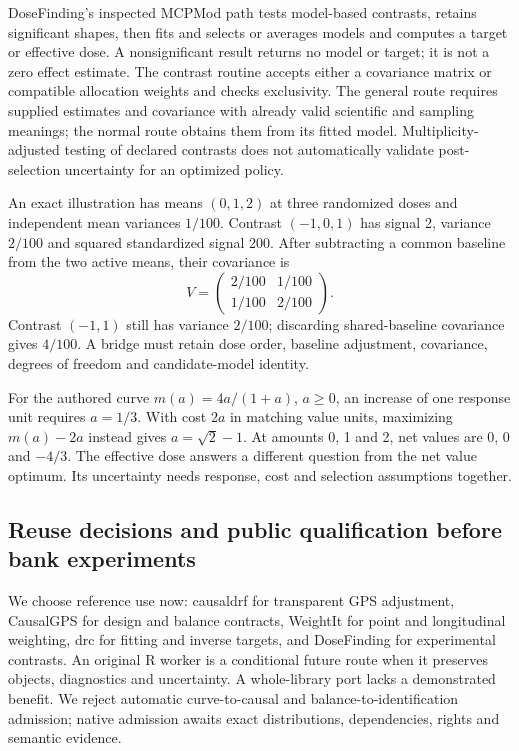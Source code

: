 DoseFinding's inspected MCPMod path tests model-based contrasts, retains
significant shapes, then fits and selects or averages models and computes a
target or effective dose. A nonsignificant result returns no model or target;
it is not a zero effect estimate. The contrast routine accepts either a
covariance matrix or compatible allocation weights and checks exclusivity.
The general route requires supplied estimates and covariance with already
valid scientific and sampling meanings; the normal route obtains them from
its fitted model. Multiplicity-adjusted testing of declared contrasts does not
automatically validate post-selection uncertainty for an optimized policy.
\citep{exec24_dose_dosefinding}

An exact illustration has means $(0,1,2)$ at three randomized doses and
independent mean variances $1/100$. Contrast $(-1,0,1)$ has signal 2, variance
$2/100$ and squared standardized signal 200. After subtracting a common
baseline from the two active means, their covariance is
\[
 V=\begin{pmatrix}2/100&1/100\\1/100&2/100\end{pmatrix}.
\]
Contrast $(-1,1)$ still has variance $2/100$; discarding shared-baseline
covariance gives $4/100$. A bridge must retain dose order, baseline adjustment,
covariance, degrees of freedom and candidate-model identity.
\citep{exec24_dose_contract}

For the authored curve $m(a)=4a/(1+a)$, $a\geq0$, an increase of one response
unit requires $a=1/3$. With cost $2a$ in matching value units, maximizing
$m(a)-2a$ instead gives $a=\sqrt2-1$. At amounts 0, 1 and 2, net values are
0, 0 and $-4/3$. The effective dose answers a different question from the net
value optimum. Its uncertainty needs response, cost and selection assumptions
together.\citep{exec24_dose_contract}

\subsection{Reuse decisions and public qualification before bank experiments}
We choose reference use now: causaldrf for transparent GPS adjustment,
CausalGPS for design and balance contracts, WeightIt for point and longitudinal
weighting, drc for fitting and inverse targets, and DoseFinding for experimental
contrasts. An original R worker is a conditional future route when it preserves
objects, diagnostics and uncertainty. A whole-library port lacks a demonstrated
benefit. We reject automatic curve-to-causal and balance-to-identification
admission; native admission awaits exact distributions, dependencies, rights
and semantic evidence.\citep{exec24_dose_contract}

